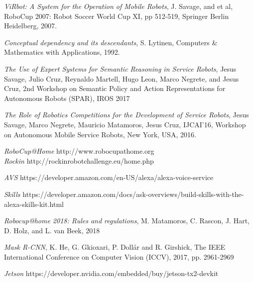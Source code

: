 \documentclass{llncs}
\begin{document}
\begin{thebibliography}{1}

{\em ViRbot: A System for the Operation of Mobile Robots}, J. Savage, and et al, RoboCup 2007: Robot Soccer World Cup XI,
pp 512-519, Springer Berlin Heidelberg, 2007.


{\em Conceptual dependency and its descendants}, S. Lytinen, Computers \& Mathematics with Applications, 1992.

\textit{The Use of Expert Systems for Semantic Reasoning in Service Robots}, Jesus Savage, Julio Cruz, Reynaldo Martell, Hugo Leon, Marco Negrete, and Jesus Cruz, 2nd Workshop on Semantic Policy and Action Representations for Autonomous Robots (SPAR), IROS 2017

{\em The Role of Robotics Competitions for the Development of Service Robots}, 
 Jesus Savage, Marco Negrete, Mauricio Matamoros, Jesus Cruz,
IJCAI'16, Workshop on Autonomous Mobile Service Robots, New York, USA, 2016.

{\em RoboCup@Home} http://www.robocupathome.org
\\
{\em Rockin} http://rockinrobotchallenge.eu/home.php

 {\em AVS} https://developer.amazon.com/en-US/alexa/alexa-voice-service

 {\em Skills} https://developer.amazon.com/docs/ask-overviews/build-skills-with-the-alexa-skills-kit.html



\textit{Robocup@home 2018: Rules and regulations}, M. Matamoros, C. Rascon, J. Hart, D. Holz, and L. van Beek, 2018

\textit{Mask R-CNN}, K. He, G. Gkioxari, P. Dollár and R. Girshick, The IEEE International Conference on Computer Vision (ICCV), 2017, pp. 2961-2969


{\em Jetson} https://developer.nvidia.com/embedded/buy/jetson-tx2-devkit

\end{thebibliography}
\end{document}
